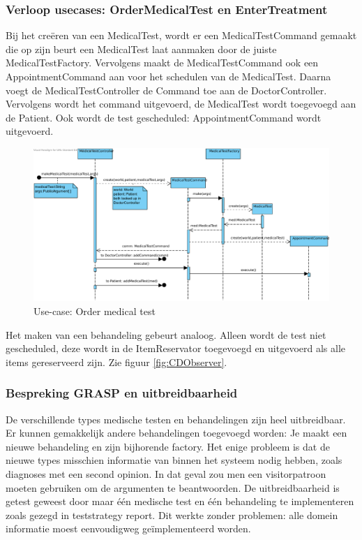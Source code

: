 \documentclass[a4paper]{article}
\begin{document}
\subsubsection{Verloop usecases: OrderMedicalTest en EnterTreatment}
Bij het cre\"eren van een MedicalTest, wordt er een MedicalTestCommand gemaakt die op zijn beurt een MedicalTest laat aanmaken door de juiste MedicalTestFactory. Vervolgens maakt de MedicalTestCommand ook een AppointmentCommand aan voor het schedulen van de MedicalTest. Daarna voegt de MedicalTestController de Command toe aan de DoctorController. Vervolgens wordt het command uitgevoerd, de MedicalTest wordt toegevoegd aan de Patient. Ook wordt de test gescheduled: AppointmentCommand wordt uitgevoerd.
\begin{figure}[h]
\centering
\includegraphics[width=\textwidth]{Pictures/OrderMedicalTest.pdf}
\caption{Use-case: Order medical test}
\label{fig:ordermedicaltest}
\end{figure}
Het maken van een behandeling gebeurt analoog. Alleen wordt de test niet gescheduled, deze wordt in de ItemReservator toegevoegd en uitgevoerd als alle items gereserveerd zijn. Zie figuur \ref{fig:CDObserver}.

\subsubsection{Bespreking GRASP en uitbreidbaarheid}
De verschillende types medische testen en behandelingen zijn heel uitbreidbaar. Er kunnen gemakkelijk andere behandelingen toegevoegd worden: Je maakt een nieuwe behandeling en zijn bijhorende factory. Het enige probleem is dat de nieuwe types misschien informatie van binnen het systeem nodig hebben, zoals diagnoses met een second opinion. In dat geval zou men een visitorpatroon moeten gebruiken om de argumenten te beantwoorden. De uitbreidbaarheid is getest geweest door maar één medische test en één behandeling te implementeren zoals gezegd in teststrategy report. Dit werkte zonder problemen: alle domein informatie moest eenvoudigweg geïmplementeerd worden. 
\end{document}
